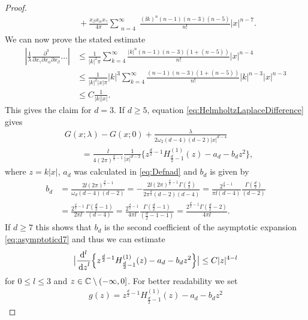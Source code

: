 \begin{proof}
\begin{align*}
    &\qquad + \frac{x_\beta x_\alpha x_\gamma}{4\pi} \sum_{\substack{n = 4}}^\infty \frac{(\ii k)^n (n - 1) (n - 3) (n - 5)}{n!} |x|^{n - 7}.
\end{align*}
We can now prove the stated estimate
\begin{align*}
  | \frac{1}{\lambda} \frac{\partial^3}{\partial x_\gamma \partial x_\alpha \partial x_\beta} \dots  |
  &\leq \frac{1}{|k|^2\pi}  \sum_{k = 4}^\infty \frac{|k|^n (n - 1) (n - 3)(1 + (n - 5))}{n!} |x|^{n - 4} \\
  &\leq \frac{1}{|k|^2 |x|\pi} |k|^3 \sum_{k = 4}^\infty \frac{(n - 1)(n - 3)(1 + (n - 5))}{n!} |k|^{n - 3} |x|^{n - 3}\\
  &\leq C \frac{1}{|k| |x|}.
\end{align*}
This gives the claim for $d = 3$.
If $d \geq 5$, equation \eqref{eq:HelmholtzLaplaceDifference} gives
\begin{align*}
  &G(x; \lambda)- G(x; 0) + \frac{\lambda}{2 \omega_2 (d - 4) (d - 2) |x|^{d - 4}} \\
  &\qquad= \frac{\ii}{4 (2\pi)^{\frac{d}{2} - 1}} \frac{1}{|x|^{d - 2}} \big\{ z^{\frac{d}{2} - 1} H_{\frac{d}{2} - 1}^{(1)}(z) - a_d - b_d z^2\big\},
\end{align*}
where $z = k|x|$, $a_d$ was calculated in \eqref{eq:Defnad} and $b_d$ is given by
\begin{align*}
 b_d 
 &= \frac{2\ii (2\pi)^{\frac{d}{2} - 1}}{\omega_d (d - 4) (d - 2)}  
 = -\frac{2\ii (2\pi)^{\frac{d}{2} - 1} \Gamma(\frac{d}{2})}{2\pi^{\frac{d}{2}} (d - 2)(d - 4)}
 = \frac{2^{\frac{d}{2} - 1} }{\pi \ii (d - 4)} \frac{\Gamma(\frac{d}{2})}{(d - 2)} \\
 &= \frac{2^{\frac{d}{2} - 1} }{2\pi \ii } \frac{\Gamma(\frac{d}{2} - 1)}{(d - 4)} 
 = \frac{2^{\frac{d}{2} - 1}}{4 \pi \ii } \frac{\Gamma(\frac{d}{2} - 1)}{(\frac{d}{2} - 1 - 1)}
 = \frac{2^{\frac{d}{2} - 1} \Gamma(\frac{d}{2} - 2)}{4 \pi \ii }.
\end{align*}
If $d \geq 7$ this shows that $b_d$ is the second coefficient of the asymptotic expansion \eqref{eq:asymptoticd7} and thus we can estimate
\begin{align}
  \label{eq:estimateDerivativesd7}
  \big| \frac{\mathrm{d}^l}{\, {\operatorname{d}\!{z}}^l} \Big\{ z^{\frac{d}{2} - 1} H_{\frac{d}{2} - 1}^{(1)}(z) - a_d - b_d z^2 \Big\} \big| \leq C |z|^{4 - l}
\end{align}
for $0 \leq l \leq 3$ and $z \in \mathbb{C} \setminus (-\infty, 0]$.
For better readability we set
\begin{align*}
  g(z) = z^{\frac{d}{2} - 1} H_{\frac{d}{2} - 1}^{(1)}(z) - a_d - b_d z^2

\end{align*}
\end{proof}

